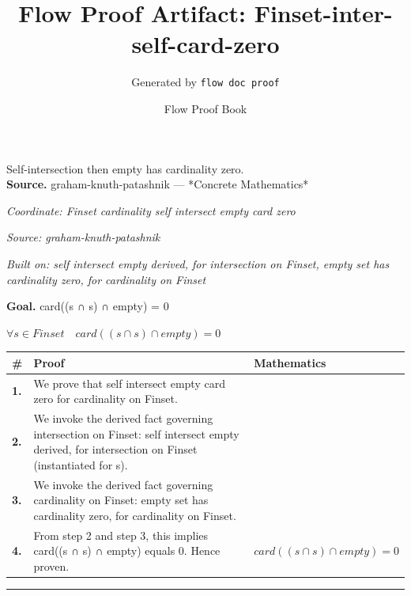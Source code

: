 \documentclass[11pt]{article}
\title{Flow Proof Artifact: Finset-inter-self-card-zero}
\author{Generated by \texttt{flow doc proof}}
\date{Flow Proof Book}
\theoremstyle{definition}
\begin{document}
\maketitle
Self-intersection then empty has cardinality zero.\\[0.5em]
\textbf{Source.} graham-knuth-patashnik — *Concrete Mathematics*\\[0.5em]
\bigskip
{}\par
\smallskip\noindent\textit{Coordinate: Finset \cdot cardinality \cdot self intersect empty card zero}\par
\smallskip\noindent\textit{Source: graham-knuth-patashnik}\par
\smallskip\noindent\textit{Built on: self intersect empty derived, for intersection on Finset, empty set has cardinality zero, for cardinality on Finset}\par
\medskip
\noindent\textbf{Goal.} card((s ∩ s) ∩ empty) = 0\par
\noindent$\displaystyle \forall s \in Finset\quad card((s ∩ s) ∩ empty) = 0$\par
\medskip
\noindent
\begin{tabular}{@{} >{\raggedright\arraybackslash}p{} >{\raggedright\arraybackslash}p{} >{\raggedleft\arraybackslash}p{} @{}}
\textbf{\#} & \textbf{Proof} & \textbf{Mathematics} \\
\midrule
\textbf{1.} & We prove that self intersect empty card zero for cardinality on Finset. & \\[0.45em]
\textbf{2.} & We invoke the derived fact governing intersection on Finset: self intersect empty derived, for intersection on Finset (instantiated for s). & \\[0.45em]
\textbf{3.} & We invoke the derived fact governing cardinality on Finset: empty set has cardinality zero, for cardinality on Finset. & \\[0.45em]
\textbf{4.} & From step 2 and step 3, this implies card((s ∩ s) ∩ empty) equals 0. Hence proven. & $\displaystyle card((s ∩ s) ∩ empty) = 0$ \\[0.45em]
\bottomrule
\end{tabular}
\label{thm:Finset-cardinality-self_intersect_empty_card_zero}
\par\medskip\hrule
\end{document}
